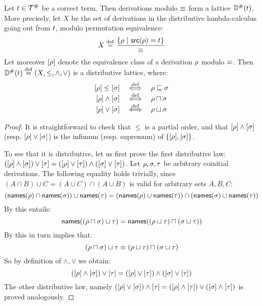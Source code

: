 \begin{theorem}
Let $t \in \mathcal{T}^{\mathtt{\#}}$ be a correct term.
Then derivations modulo $\equiv$ form a lattice $\mathbb{D}^{\mathtt{\#}}(t)$.
More precisely, let $X$ be the set of derivations in the distributive lambda-calculus going out from $t$,
modulo permutation equivalence:
\[
  X \overset{\mathrm{def}}{=} \frac{\{\rho \ |\  \mathsf{src}(\rho) = t\}}{\equiv}
\]
Let moreover ${[\rho]}$ denote the equivalence class of a derivation $\rho$
modulo $\equiv$.
Then $\mathbb{D}^{\mathtt{\#}}(t) \overset{\mathrm{def}}{=} (X, \leq, \land, \lor)$ is a distributive lattice, where:
\[
  \begin{array}{rcl}
  {[\rho]} \leq {[\sigma]}  & \overset{\mathrm{def}}{\iff} & \rho \sqsubseteq \sigma \\
  {[\rho]} \land {[\sigma]} & \overset{\mathrm{def}}{\iff} & \rho \sqcap \sigma \\
  {[\rho]} \lor {[\sigma]}  & \overset{\mathrm{def}}{\iff} & \rho \sqcup \sigma \\
  \end{array}
\]
\end{theorem}
\begin{proof}
It is straightforward to check that $\leq$ is a partial order,
and that ${[\rho]} \land {[\sigma]}$ (resp. ${[\rho]} \lor {[\sigma]}$)
is the infimum (resp. supremum) of $\{{[\rho]},{[\sigma]}\}$.

To see that it is distributive, let us first prove the first distributive law:
$({[\rho]} \land {[\sigma]}) \lor {[\tau]} =
({[\rho]} \lor {[\tau]}) \land ({[\sigma]} \lor {[\tau]})$.
Let $\rho,\sigma,\tau$ be arbitrary coinitial derivations.
The following equality holds trivially, since
$(A \cap B) \cup C = (A \cup C) \cap (A \cup B)$ is valid for arbitrary sets $A, B, C$:
  \[
    (\mathsf{names}(\rho) \cap \mathsf{names}(\sigma)) \cup \mathsf{names}(\tau)
    =
    (\mathsf{names}(\rho) \cup \mathsf{names}(\tau)) \cap (\mathsf{names}(\sigma) \cup \mathsf{names}(\tau))
  \]
By  this entails:
  \[
    \mathsf{names}((\rho \sqcap \sigma) \sqcup \tau)
    =
    \mathsf{names}((\rho \sqcup \tau) \sqcap (\sigma \sqcup \tau))
  \]
By  this in turn implies that:
  \[
    (\rho \sqcap \sigma) \sqcup \tau
    \equiv
    (\rho \sqcup \tau) \sqcap (\sigma \sqcup \tau)
  \]
So by definition of $\land,\lor$ we obtain:
  \[
    ({[\rho]} \land {[\sigma]}) \lor {[\tau]}
    =
    ({[\rho]} \lor {[\tau]}) \land ({[\sigma]} \lor {[\tau]})
  \]
The other distributive law, namely
$({[\rho]} \lor {[\sigma]}) \land {[\tau]} =
({[\rho]} \land {[\tau]}) \lor ({[\sigma]} \land {[\tau]})$
is proved analogously.
\end{proof}

